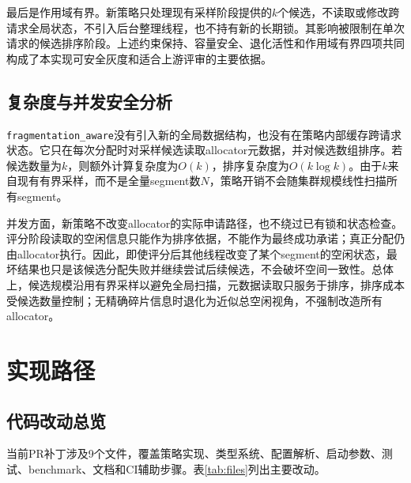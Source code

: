 \documentclass[UTF8,zihao=-4,a4paper]{ctexart}
\newcommand{\strategy}{\texttt{fragmentation\_aware}}
\begin{document}
最后是作用域有界。新策略只处理现有采样阶段提供的\(k\)个候选，不读取或修改跨请求全局状态，不引入后台整理线程，也不持有新的长期锁。其影响被限制在单次请求的候选排序阶段。上述约束保持、容量安全、退化活性和作用域有界四项共同构成了本实现可安全灰度和适合上游评审的主要依据。

\subsection{复杂度与并发安全分析}

\strategy{}没有引入新的全局数据结构，也没有在策略内部缓存跨请求状态。它只在每次分配时对采样候选读取allocator元数据，并对候选数组排序。若候选数量为\(k\)，则额外计算复杂度为\(O(k)\)，排序复杂度为\(O(k\log k)\)。由于\(k\)来自现有有界采样，而不是全量segment数\(N\)，策略开销不会随集群规模线性扫描所有segment。

并发方面，新策略不改变allocator的实际申请路径，也不绕过已有锁和状态检查。评分阶段读取的空闲信息只能作为排序依据，不能作为最终成功承诺；真正分配仍由allocator执行。因此，即使评分后其他线程改变了某个segment的空闲状态，最坏结果也只是该候选分配失败并继续尝试后续候选，不会破坏空间一致性。总体上，候选规模沿用有界采样以避免全局扫描，元数据读取只服务于排序，排序成本受候选数量控制；无精确碎片信息时退化为近似总空闲视角，不强制改造所有allocator。

\section{实现路径}

\subsection{代码改动总览}

当前PR补丁涉及9个文件，覆盖策略实现、类型系统、配置解析、启动参数、测试、benchmark、文档和CI辅助步骤。表\ref{tab:files}列出主要改动。
\end{document}
